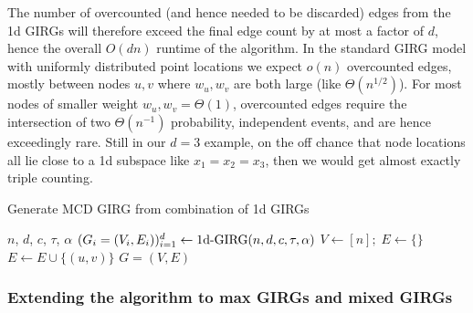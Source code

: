The number of overcounted (and hence needed to be discarded) edges from the 1d GIRGs will therefore exceed the final edge count by at most a factor of $d$, hence the overall $O(dn)$ runtime of the algorithm. In the standard GIRG model with uniformly distributed point locations we expect $o(n)$ overcounted edges, mostly between nodes $u,v$ where $w_u, w_v$ are both large (like $\Theta(n^{1/2})$). For most nodes of smaller weight $w_u, w_v = \Theta(1)$, overcounted edges require the intersection of two $\Theta(n^{-1})$ probability, independent events, and are hence exceedingly rare. Still in our $d=3$ example, on the off chance that node locations all lie close to a 1d subspace like $x_1 = x_2 = x_3$, then we would get almost exactly triple counting.


\begin{algorithm}
    \caption{Generate MCD GIRG from combination of 1d GIRGs}
    \label{alg:mcd_1d_combination_algo}
    
    \begin{algorithmic}
    \Require $n$, $d$, $c$, $\tau$, $\alpha$
    \State $(G_i = (V_i, E_i))_{i=1}^d \gets \text{1d-}\mathrm{GIRG}(n,d,c,\tau, \alpha)$
    \State $V \gets [n];\; E \gets \{\}$
                \State $E \gets E \cup \{(u, v)\}$
            \EndIf
        \EndFor
    \EndFor
    \State \Return $G=(V,E)$
\end{algorithmic}
\end{algorithm}


\subsubsection{Extending the algorithm to max GIRGs and mixed GIRGs}
